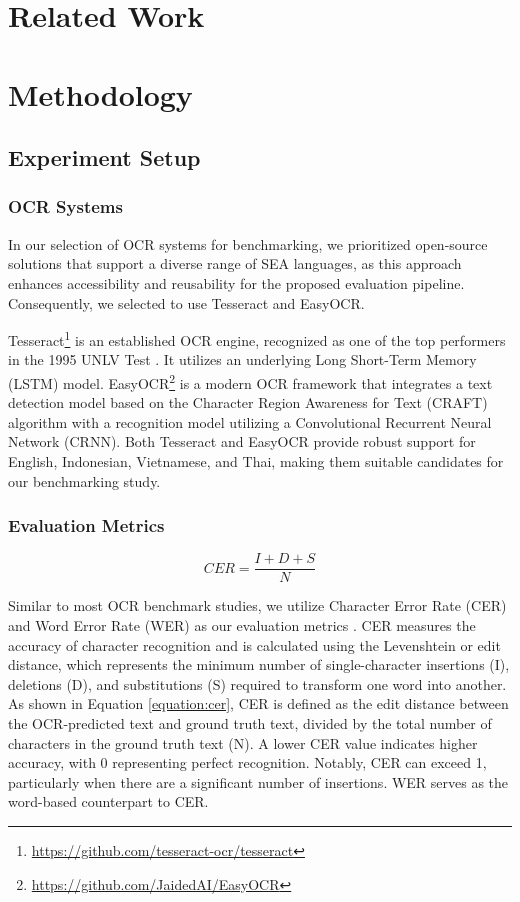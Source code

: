 \documentclass[12pt,oneside]{memoir}
\begin{document}
\chapter{Related Work}

\chapter{Methodology}

\section{Experiment Setup}

\subsection{OCR Systems}

In our selection of OCR systems for benchmarking, we prioritized open-source 
solutions that support a diverse range of SEA languages, as this approach 
enhances accessibility and reusability for the proposed evaluation pipeline. 
Consequently, we selected to use Tesseract and EasyOCR. 

Tesseract\footnote{\url{https://github.com/tesseract-ocr/tesseract}} is an established OCR engine, recognized as one of the top performers 
in the 1995 UNLV Test \parencite{rice-etal-1995}. It utilizes an underlying Long Short-Term Memory (LSTM) 
model. EasyOCR\footnote{\url{https://github.com/JaidedAI/EasyOCR}} is a modern OCR framework that integrates a text detection model 
based on the Character Region Awareness for Text (CRAFT) algorithm with a 
recognition model utilizing a Convolutional Recurrent Neural Network (CRNN). Both 
Tesseract and EasyOCR provide robust support for English, Indonesian, Vietnamese, 
and Thai, making them suitable candidates for our benchmarking study.

\subsection{Evaluation Metrics}

\begin{equation}
    CER = \frac{I + D + S}{N}
    \label{equation:cer}
\end{equation}

Similar to most OCR benchmark studies, we utilize Character Error Rate (CER) and 
Word Error Rate (WER) as our evaluation metrics \parencite{hegghammer-2022, ignat-etal-2022}. CER measures the accuracy of 
character recognition and is calculated using the Levenshtein or edit distance, 
which represents the minimum number of single-character insertions (I), deletions (D), 
and substitutions (S) required to transform one word into another. As shown in 
Equation \ref{equation:cer}, CER is defined as the edit distance between the 
OCR-predicted text and ground truth text, divided by the total number of characters 
in the ground truth text (N). A lower CER value indicates higher accuracy, with 
0 representing perfect recognition. Notably, CER can exceed 1, particularly when 
there are a significant number of insertions. WER serves as the word-based counterpart to CER.
\end{document}

